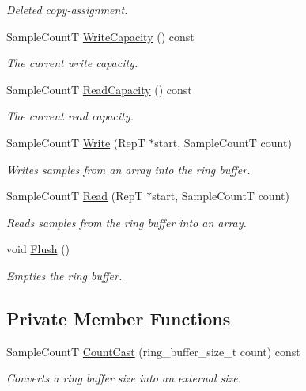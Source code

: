 \begin{DoxyCompactItemize}
\begin{DoxyCompactList}\small\item\em Deleted copy-\/assignment. \end{DoxyCompactList}\item 
Sample\+Count\+T \hyperlink{classRingBuffer_ab00617ab6e379ad146cb7b80079f4c4c}{Write\+Capacity} () const 
\begin{DoxyCompactList}\small\item\em The current write capacity. \end{DoxyCompactList}\item 
Sample\+Count\+T \hyperlink{classRingBuffer_a7086cc66306105db205842af7a88c2d8}{Read\+Capacity} () const 
\begin{DoxyCompactList}\small\item\em The current read capacity. \end{DoxyCompactList}\item 
Sample\+Count\+T \hyperlink{classRingBuffer_aa7f863968cb641946b0cf341bda11e16}{Write} (Rep\+T $\ast$start, Sample\+Count\+T count)
\begin{DoxyCompactList}\small\item\em Writes samples from an array into the ring buffer. \end{DoxyCompactList}\item 
Sample\+Count\+T \hyperlink{classRingBuffer_af892330ee102bd50a493b8afa814a0f0}{Read} (Rep\+T $\ast$start, Sample\+Count\+T count)
\begin{DoxyCompactList}\small\item\em Reads samples from the ring buffer into an array. \end{DoxyCompactList}\item 
\hypertarget{classRingBuffer_a1eb1acca6905e7678fbbdb70238cdc26}{void \hyperlink{classRingBuffer_a1eb1acca6905e7678fbbdb70238cdc26}{Flush} ()}\label{classRingBuffer_a1eb1acca6905e7678fbbdb70238cdc26}

\begin{DoxyCompactList}\small\item\em Empties the ring buffer. \end{DoxyCompactList}\end{DoxyCompactItemize}
\subsection*{Private Member Functions}
\begin{DoxyCompactItemize}
\item 
Sample\+Count\+T \hyperlink{classRingBuffer_ae907c82ba714a087d9f35b089f9fbf77}{Count\+Cast} (ring\+\_\+buffer\+\_\+size\+\_\+t count) const 
\begin{DoxyCompactList}\small\item\em Converts a ring buffer size into an external size. \end{DoxyCompactList}\end{DoxyCompactItemize}
